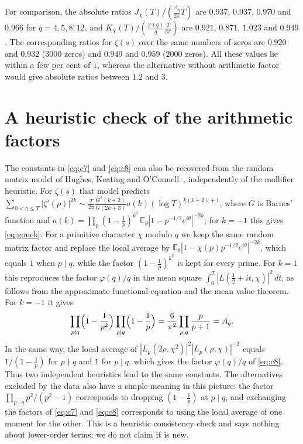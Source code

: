 \documentclass[11pt]{amsart}
\begin{document}
For comparison, the absolute ratios $J_\chi(T)/(\frac{A_q}{2\pi}T)$ are $0.937$, $0.937$, $0.970$ and $0.966$ for
$q=4,5,8,12$, and $K_\chi(T)/(\frac{\varphi(q)}{q}\frac{T}{2\pi})$ are $0.921$, $0.871$, $1.023$ and $0.949$. The
corresponding ratios for $\zeta(s)$ over the same numbers of zeros are $0.920$ and $0.932$ ($3000$ zeros) and $0.949$
and $0.959$ ($2000$ zeros). All these values lie within a few per cent of $1$, whereas the alternative without
arithmetic factor would give absolute ratios between $1.2$ and $3$.

\section{A heuristic check of the arithmetic factors}\label{sec:hko}

The constants in \eqref{eq:c7} and \eqref{eq:c8} can also be recovered from the random matrix model of Hughes, Keating
and O'Connell~\cite{HKO}, independently of the mollifier heuristic. For $\zeta(s)$ that model predicts
$\sum_{0<\gamma\le T}|\zeta'(\rho)|^{2k}\sim\frac{T}{2\pi}\frac{G^{2}(k+2)}{G(2k+3)}a(k)(\log T)^{k(k+2)+1}$, where $G$ is
Barnes' function and $a(k)=\prod_p(1-\frac1p)^{k^{2}}\,\mathbb{E}_\theta|1-p^{-1/2}e^{i\theta}|^{-2k}$; for $k=-1$ this
gives \eqref{eq:gonek}. For a primitive character $\chi$ modulo $q$ we keep the same random matrix factor and replace
the local average by $\mathbb{E}_\theta|1-\chi(p)p^{-1/2}e^{i\theta}|^{-2k}$, which equals $1$ when $p\mid q$, while the
factor $(1-\frac1p)^{k^{2}}$ is kept for every prime. For $k=1$ this reproduces the factor $\varphi(q)/q$ in the mean
square $\int_0^T|L(\tfrac12+it,\chi)|^{2}\,dt$, as follows from the approximate functional equation and the mean value
theorem. For $k=-1$ it gives
\[
\prod_{p\nmid q}\Bigl(1-\frac1{p^{2}}\Bigr)\prod_{p\mid q}\Bigl(1-\frac1p\Bigr)=\frac{6}{\pi^{2}}\prod_{p\mid q}\frac{p}{p+1}=A_q .
\]
In the same way, the local average of $|L_p(2\rho,\chi^{2})|^{2}|L_p(\rho,\chi)|^{-2}$ equals $1/(1-\frac1p)$ for
$p\nmid q$ and $1$ for $p\mid q$, which gives the factor $\varphi(q)/q$ of \eqref{eq:c8}. Thus two independent heuristics
lead to the same constants. The alternatives excluded by the data also have a simple meaning in this picture: the
factor $\prod_{p\mid q}p^{2}/(p^{2}-1)$ corresponds to dropping $(1-\frac1p)$ at $p\mid q$, and exchanging the factors
of \eqref{eq:c7} and \eqref{eq:c8} corresponds to using the local average of one moment for the other. This is a
heuristic consistency check and says nothing about lower-order terms; we do not claim it is new.
\end{document}
